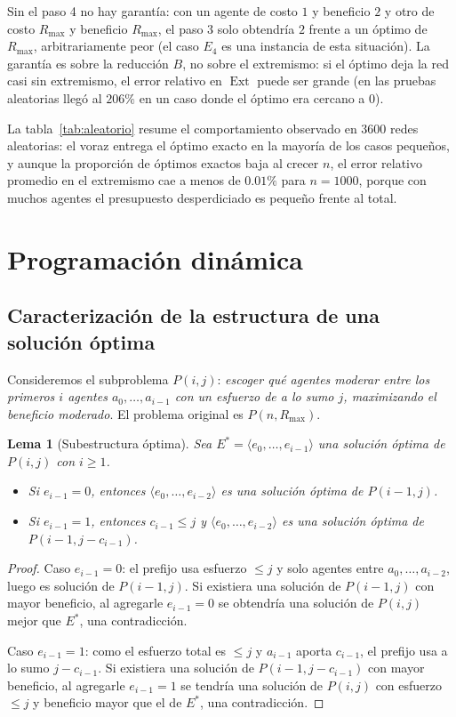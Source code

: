 \documentclass[11pt,letterpaper]{article}
\newtheorem{lema}{Lema}
\newcommand{\Ext}{\operatorname{Ext}}
\newcommand{\Rmax}{R_{\max}}
\begin{document}
Sin el paso 4 no hay garantía: con un agente de costo $1$ y beneficio $2$ y
otro de costo $\Rmax$ y beneficio $\Rmax$, el paso 3 solo obtendría $2$
frente a un óptimo de $\Rmax$, arbitrariamente peor (el caso $E_4$ es una
instancia de esta situación). La garantía
es sobre la reducción $B$, no sobre el extremismo: si el óptimo deja la red
casi sin extremismo, el error relativo en $\Ext$ puede ser grande (en las
pruebas aleatorias llegó al $206\%$ en un caso donde el óptimo era cercano a
$0$).

La tabla~\ref{tab:aleatorio} resume el comportamiento observado en
$3600$ redes aleatorias: el voraz entrega el óptimo exacto en la mayoría de
los casos pequeños, y aunque la proporción de óptimos exactos baja al crecer
$n$, el error relativo promedio en el extremismo cae a menos de $0.01\%$
para $n = 1000$, porque con muchos agentes el presupuesto desperdiciado es
pequeño frente al total.

\section{Programación dinámica}

\subsection{Caracterización de la estructura de una solución óptima}

Consideremos el subproblema $P(i, j)$: \emph{escoger qué agentes moderar entre
los primeros $i$ agentes $a_0,\dots,a_{i-1}$ con un esfuerzo de a lo sumo
$j$, maximizando el beneficio moderado}. El problema original es $P(n,\Rmax)$.

\begin{lema}[Subestructura óptima]
Sea $E^* = \langle e_0,\dots,e_{i-1}\rangle$ una solución óptima de
$P(i,j)$ con $i \ge 1$.
\begin{itemize}
  \item Si $e_{i-1} = 0$, entonces $\langle e_0,\dots,e_{i-2}\rangle$ es una
        solución óptima de $P(i-1, j)$.
  \item Si $e_{i-1} = 1$, entonces $c_{i-1} \le j$ y
        $\langle e_0,\dots,e_{i-2}\rangle$ es una solución óptima de
        $P(i-1, j - c_{i-1})$.
\end{itemize}
\end{lema}
\begin{proof}
Caso $e_{i-1} = 0$: el prefijo usa esfuerzo $\le j$ y solo agentes entre
$a_0,\dots,a_{i-2}$, luego es solución de $P(i-1,j)$. Si existiera una
solución de $P(i-1,j)$ con mayor beneficio, al agregarle $e_{i-1}=0$ se
obtendría una solución de $P(i,j)$ mejor que $E^*$, una contradicción.

Caso $e_{i-1} = 1$: como el esfuerzo total es $\le j$ y $a_{i-1}$ aporta
$c_{i-1}$, el prefijo usa a lo sumo $j - c_{i-1}$. Si existiera una solución
de $P(i-1, j-c_{i-1})$ con mayor beneficio, al agregarle $e_{i-1}=1$ se
tendría una solución de $P(i,j)$ con esfuerzo $\le j$ y beneficio mayor que
el de $E^*$, una contradicción.
\end{proof}
\end{document}
